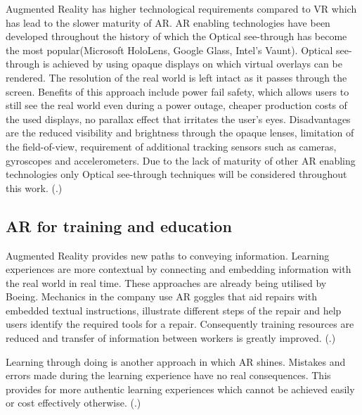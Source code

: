 \documentclass[12pt, a4paper,oneside, nocenter]{thesis}
\renewcommand{\citep}[1]{(\citealp{#1}.)}
\begin{document}
\par
Augmented Reality has higher technological requirements compared to VR which has lead to the slower maturity of AR. AR enabling technologies have been developed throughout the history of which the Optical see-through has become the most popular(Microsoft HoloLens, Google Glass, Intel's Vaunt). Optical see-through is achieved by using opaque displays on which virtual overlays can be rendered. The resolution of the real world is left intact as it passes through the screen. Benefits of this approach include power fail safety, which allows users to still see the real world even during a power outage, cheaper production costs of the used displays, no parallax effect that irritates the user's eyes. Disadvantages are the reduced visibility and brightness through the opaque lenses, limitation of the field-of-view, requirement of additional tracking sensors such as cameras, gyroscopes and accelerometers. Due to the lack of maturity of other AR enabling technologies only Optical see-through techniques will be considered throughout this work. \citep{vrjournal}
\subsection{AR for training and education}%
Augmented Reality provides new paths to conveying information. Learning experiences are more contextual by connecting and embedding information with the real world in real time. These approaches are already being utilised by Boeing. 
Mechanics in the company use AR goggles that aid repairs with embedded textual instructions, 
illustrate different steps of the repair and help users identify the required tools for a repair. 
Consequently training resources are reduced and transfer of information between workers is greatly 
improved. \citep{horizon-report}
\par
Learning through doing is another approach in which AR shines. Mistakes and errors made during the learning
experience have no real consequences. This provides for more authentic learning experiences which cannot be
achieved easily or cost effectively otherwise. \citep{augmented-reality}
\end{document}
